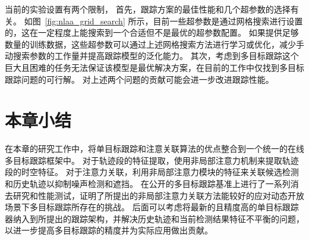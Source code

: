 当前的实验设置有两个限制，
首先，跟踪方案的最佳性能和几个超参数的选择有关。
如图~\ref{fig:nlaa_grid_search} 所示，目前一些超参数是通过网格搜索进行设置的，这在一定程度上能搜索到一个合适但不是最优的超参数配置。
如果提供足够数量的训练数据，这些超参数可以通过上述网格搜索方法进行学习或优化，减少手动搜索参数的工作量并提高跟踪模型的泛化能力。 
其次，考虑到多目标跟踪这个巨大且困难的任务无法保证该模型是最优解决方案，在目前的工作中仅找到多目标跟踪问题的可行解。 
对上述两个问题的贡献可能会进一步改进跟踪性能。


\section{本章小结}
在本章的研究工作中，将单目标跟踪和注意关联算法的优点整合到一个统一的在线多目标跟踪框架中。 
对于轨迹段的特征提取，使用非局部注意力机制来提取轨迹段的时空特征。
对于注意力关联，利用非局部注意力模块的特征来关联候选检测和历史轨迹以抑制噪声检测和遮挡。 
在公开的多目标跟踪基准上进行了一系列消去研究和性能测试，证明了所提出的非局部注意力关联方法能较好的应对动态开放场景下多目标跟踪所存在的挑战。 
后面可以考虑将最新的且精度高的单目标跟踪器纳入到所提出的跟踪架构，并解决历史轨迹和当前检测结果特征不平衡的问题，以进一步提高多目标跟踪的精度并为实际应用做出贡献。





